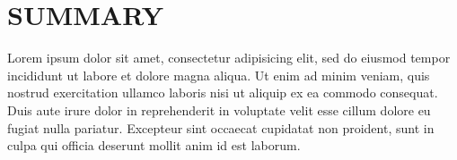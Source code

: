 \documentclass[apj, revtex4]{emulateapj}
\begin{document}
\section{SUMMARY}
Lorem ipsum dolor sit amet, consectetur adipisicing elit, sed do eiusmod tempor incididunt ut labore et dolore magna aliqua. Ut enim ad minim veniam, quis nostrud exercitation ullamco laboris nisi ut aliquip ex ea commodo consequat. Duis aute irure dolor in reprehenderit in voluptate velit esse cillum dolore eu fugiat nulla pariatur. Excepteur sint occaecat cupidatat non proident, sunt in culpa qui officia deserunt mollit anim id est laborum.

\end{document}
